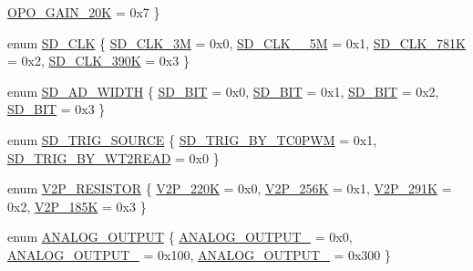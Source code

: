 \begin{DoxyCompactItemize}
\mbox{\hyperlink{a00002_a6424f6db97a2e691b73af9c4053f1650a44bf632448f2bed40aad8456d4ab211e}{O\+P\+O\+\_\+\+G\+A\+I\+N\+\_\+20K}} = 0x7
 \}
\item 
enum \mbox{\hyperlink{a00002_aebc3424fa91b715741f0320561ecfbb0}{S\+D\+\_\+\+C\+LK}} \{ \mbox{\hyperlink{a00002_aebc3424fa91b715741f0320561ecfbb0a720c5991be73063f5ab035440f26b486}{S\+D\+\_\+\+C\+L\+K\+\_\+3M}} = 0x0, 
\mbox{\hyperlink{a00002_aebc3424fa91b715741f0320561ecfbb0a5241c8457df3f987f10797b36db20771}{S\+D\+\_\+\+C\+L\+K\+\_\+\_\+5M}} = 0x1, 
\mbox{\hyperlink{a00002_aebc3424fa91b715741f0320561ecfbb0a37bbada3115f676b49cc087c5caac0d3}{S\+D\+\_\+\+C\+L\+K\+\_\+781K}} = 0x2, 
\mbox{\hyperlink{a00002_aebc3424fa91b715741f0320561ecfbb0ace583ebd6e97c856a883187711ea4226}{S\+D\+\_\+\+C\+L\+K\+\_\+390K}} = 0x3
 \}
\item 
enum \mbox{\hyperlink{a00002_a44030e617a742aba101c6dcd3ec2078e}{S\+D\+\_\+\+A\+D\+\_\+\+W\+I\+D\+TH}} \{ \mbox{\hyperlink{a00002_a44030e617a742aba101c6dcd3ec2078ea9c86002a4a99d0d440bca9b7f8d2ec93}{S\+D\+\_\+B\+IT}} = 0x0, 
\mbox{\hyperlink{a00002_a44030e617a742aba101c6dcd3ec2078ea43562124882d2ecf1ce1b062c46e035c}{S\+D\+\_\+B\+IT}} = 0x1, 
\mbox{\hyperlink{a00002_a44030e617a742aba101c6dcd3ec2078eacac5c6814a8f28e35ebeef99751a9d5f}{S\+D\+\_\+B\+IT}} = 0x2, 
\mbox{\hyperlink{a00002_a44030e617a742aba101c6dcd3ec2078ea3a9f3242e2567dcfb29f566e45cf6de0}{S\+D\+\_\+B\+IT}} = 0x3
 \}
\item 
enum \mbox{\hyperlink{a00002_ab266bb772aaf5cffad6bede99cfb094c}{S\+D\+\_\+\+T\+R\+I\+G\+\_\+\+S\+O\+U\+R\+CE}} \{ \mbox{\hyperlink{a00002_ab266bb772aaf5cffad6bede99cfb094ca2da9ae6568d907b90ab68f56f8605ada}{S\+D\+\_\+\+T\+R\+I\+G\+\_\+\+B\+Y\+\_\+\+T\+C0\+P\+WM}} = 0x1, 
\mbox{\hyperlink{a00002_ab266bb772aaf5cffad6bede99cfb094ca9596adcc3a82f8e983e664a6ed5144a6}{S\+D\+\_\+\+T\+R\+I\+G\+\_\+\+B\+Y\+\_\+\+W\+T2\+R\+E\+AD}} = 0x0
 \}
\item 
enum \mbox{\hyperlink{a00002_a80255c41c3764feff9b79664f15feb46}{V2\+P\+\_\+\+R\+E\+S\+I\+S\+T\+OR}} \{ \mbox{\hyperlink{a00002_a80255c41c3764feff9b79664f15feb46a1ac9774056594cac22ae2c6431fa4277}{V2\+P\+\_\+220K}} = 0x0, 
\mbox{\hyperlink{a00002_a80255c41c3764feff9b79664f15feb46a4b7eb698a06cc149cbb1b7f8f4dd4a8e}{V2\+P\+\_\+256K}} = 0x1, 
\mbox{\hyperlink{a00002_a80255c41c3764feff9b79664f15feb46ae20e5b8adb1fa31fa8df9a56d05e7eb5}{V2\+P\+\_\+291K}} = 0x2, 
\mbox{\hyperlink{a00002_a80255c41c3764feff9b79664f15feb46aa035ba8725fe8565c5505a295c22ea8e}{V2\+P\+\_\+185K}} = 0x3
 \}
\item 
enum \mbox{\hyperlink{a00002_a4d490931c48f5330b52533397251335c}{A\+N\+A\+L\+O\+G\+\_\+\+O\+U\+T\+P\+UT}} \{ \mbox{\hyperlink{a00002_a4d490931c48f5330b52533397251335cacddac909ab33947534e48dd4db264d74}{A\+N\+A\+L\+O\+G\+\_\+\+O\+U\+T\+P\+U\+T\+\_}} = 0x0, 
\mbox{\hyperlink{a00002_a4d490931c48f5330b52533397251335cae3e86cb61e54d2d71a936d57768b2c04}{A\+N\+A\+L\+O\+G\+\_\+\+O\+U\+T\+P\+U\+T\+\_}} = 0x100, 
\mbox{\hyperlink{a00002_a4d490931c48f5330b52533397251335ca778485bb7dac9a00dadf2d72aa1606e1}{A\+N\+A\+L\+O\+G\+\_\+\+O\+U\+T\+P\+U\+T\+\_}} = 0x300
 \}
\end{DoxyCompactItemize}

